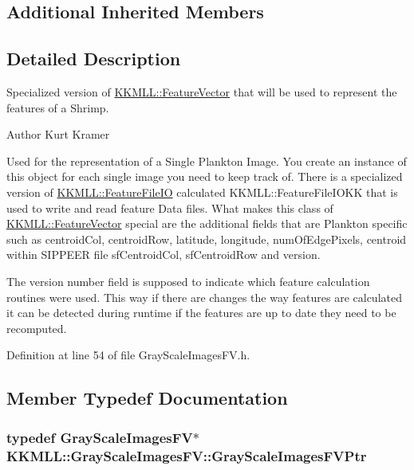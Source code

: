 \subsection*{Additional Inherited Members}


\subsection{Detailed Description}
Specialized version of \hyperlink{class_k_k_m_l_l_1_1_feature_vector}{K\+K\+M\+L\+L\+::\+Feature\+Vector} that will be used to represent the features of a Shrimp. 

\begin{DoxyAuthor}{Author}
Kurt Kramer
\end{DoxyAuthor}
Used for the representation of a Single Plankton Image. You create an instance of this object for each single image you need to keep track of. There is a specialized version of \hyperlink{class_k_k_m_l_l_1_1_feature_file_i_o}{K\+K\+M\+L\+L\+::\+Feature\+File\+IO} calculated K\+K\+M\+L\+L\+::\+Feature\+File\+I\+O\+KK that is used to write and read feature Data files. What makes this class of \hyperlink{class_k_k_m_l_l_1_1_feature_vector}{K\+K\+M\+L\+L\+::\+Feature\+Vector} special are the additional fields that are Plankton specific such as centroid\+Col, centroid\+Row, latitude, longitude, num\+Of\+Edge\+Pixels, centroid within S\+I\+P\+P\+E\+ER file sf\+Centroid\+Col, sf\+Centroid\+Row and version.

The version number field is supposed to indicate which feature calculation routines were used. This way if there are changes the way features are calculated it can be detected during runtime if the features are up to date they need to be recomputed. 

Definition at line 54 of file Gray\+Scale\+Images\+F\+V.\+h.



\subsection{Member Typedef Documentation}
\subsubsection[{\texorpdfstring{Gray\+Scale\+Images\+F\+V\+Ptr}{GrayScaleImagesFVPtr}}]{\setlength{\rightskip}{0pt plus 5cm}typedef {\bf Gray\+Scale\+Images\+FV}$\ast$ {\bf K\+K\+M\+L\+L\+::\+Gray\+Scale\+Images\+F\+V\+::\+Gray\+Scale\+Images\+F\+V\+Ptr}}\hypertarget{class_k_k_m_l_l_1_1_gray_scale_images_f_v_af5c112fdba5e66d936a4bb19b14f41a9}{}\label{class_k_k_m_l_l_1_1_gray_scale_images_f_v_af5c112fdba5e66d936a4bb19b14f41a9}


